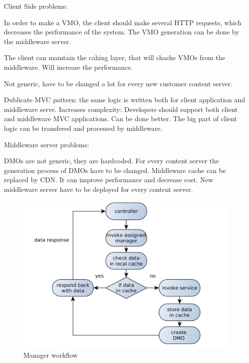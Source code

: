 Client Side problems:

In order to make a VMO, the client should make several HTTP requests, which decreases the performance of the system. The VMO generation can be done by the middleware server.

The client can maintain the cahing layer, that will chache VMOs from the middleware. Will increase the performance.

Not generic, have to be changed a lot for every new customer content server.

Dublicate MVC pattern: the same logic is written both for client application and middleware serve. Increases complexity: Developers should support both client and middleware MVC applications. Can be done better. The big part of client logic can be transfered and processed by middleware. 


Middleware server problems:

DMOs are not generic, they are hardcoded. For every content server the generation process of DMOs have to be changed.
Middleware cache can be replaced by CDN. It can improve performance and decrease cost. 
New middleware server have to be deployed for every content server.


\begin{figure}[h]
    \centering
	\includegraphics[width=\textwidth]{images/via_manager_1.png}
    \caption{Manager workflow}
    \label{fig:via_manager}
\end{figure}

